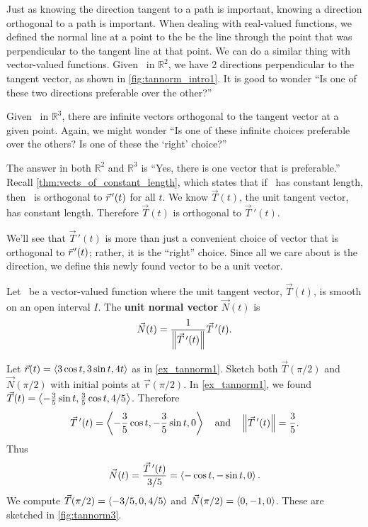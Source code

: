 Just as knowing the direction tangent to a path is important, knowing a direction orthogonal to a path is important. When dealing with real-valued functions, we defined the normal line at a point to the be the line through the point that was perpendicular to the tangent line at that point. We can do a similar thing with vector-valued functions. Given \vrt\ in $\mathbb{R}^2$, we have 2 directions perpendicular to the tangent vector, as shown in \autoref{fig:tannorm_intro1}. It is good to wonder ``Is one of these two directions preferable over the other?''

Given \vrt\ in $\mathbb{R}^3$,  there are infinite vectors orthogonal to the tangent vector at a given point. Again, we might wonder ``Is one of these infinite choices preferable over the others? Is one of these the `right' choice?''

The answer in both $\mathbb{R}^2$ and $\mathbb{R}^3$ is ``Yes, there is one vector that is preferable.'' %
Recall \autoref{thm:vects_of_constant_length}, which states that if \vrt\ has constant length, then \vrt\ is orthogonal to $\vec r\hskip1.25pt '(t)$ for all $t$. We know $\vec T(t)$, the unit tangent vector, has constant length. Therefore $\vec T(t)$ is orthogonal to $\vec T\,'(t)$.

We'll see that $\vec T\,'(t)$ is more than just a convenient choice of vector that is orthogonal to $\vec r\hskip1.25pt '(t)$; rather, it is the ``right'' choice. Since all we care about is the direction, we define this newly found vector to be a unit vector.


\begin{definition}\label{def:unit_normal}%
Let \vrt\ be a vector-valued function where the unit tangent vector, $\vec T(t)$, is smooth on an open interval $I$. The \textbf{unit normal vector} $\vec N(t)$ is
\[\vec N(t) = \frac1{\left\lVert \vec T\,'(t) \right\rVert}\vec T\,'(t).\]
\end{definition}

\begin{example}\label{ex_tannorm3}%
Let $\vec r(t) =\left\langle 3\cos t, 3\sin t, 4t\right\rangle$ as in \autoref{ex_tannorm1}. Sketch both $\vec T(\pi/2)$ and $\vec N(\pi/2)$ with initial points at $\vec r(\pi/2)$.
\solution
In \autoref{ex_tannorm1}, we found $\vec T(t)=\left\langle -\frac35\sin t,\frac35\cos t,4/5\right\rangle$. Therefore 
\[\vec T\,'(t) =\left\langle -\frac35\cos t,-\frac35\sin t,0\right\rangle\quad \text{and} \quad \left\lVert \vec T\,'(t) \right\rVert = \frac35.\]
Thus
\[\vec N(t) = \frac{\vec T\,'(t)}{3/5} =\left\langle -\cos t,-\sin t,0\right\rangle.\]
We compute $\vec T(\pi/2) =\left\langle -3/5,0,4/5\right\rangle$ and $\vec N(\pi/2) =\left\langle 0,-1,0\right\rangle$. These are sketched in \autoref{fig:tannorm3}.
\end{example}

